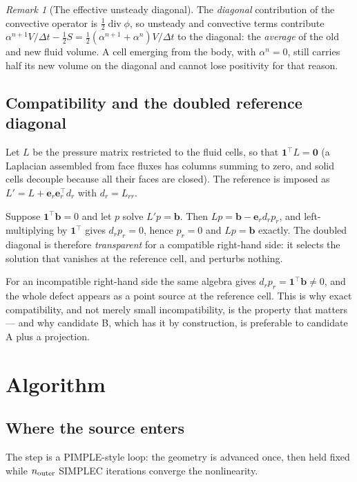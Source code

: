 \documentclass[11pt,a4paper]{article}
\theoremstyle{remark}
\newtheorem{remark}{Remark}
\newcommand{\dt}{\Delta t}
\begin{document}
\begin{remark}[The effective unsteady diagonal]
The \emph{diagonal} contribution of the convective operator is $\tfrac12\operatorname{div}\phi$,
so unsteady and convective terms contribute
$\alpha^{n+1}V/\dt-\tfrac12 S=\tfrac12(\alpha^{n+1}+\alpha^{n})V/\dt$ to the diagonal: the
\emph{average} of the old and new fluid volume. A cell emerging from the body, with
$\alpha^{n}=0$, still carries half its new volume on the diagonal and cannot lose positivity for
that reason.
\end{remark}

\subsection{Compatibility and the doubled reference diagonal}
\label{sec:compat}

Let $L$ be the pressure matrix restricted to the fluid cells, so that $\bm{1}^{\!\top}L=\bm{0}$
(a Laplacian assembled from face fluxes has columns summing to zero, and solid cells decouple
because all their faces are closed). The reference is imposed as
$L'=L+\bm{e}_r\bm{e}_r^{\!\top}d_r$ with $d_r=L_{rr}$.

Suppose $\bm{1}^{\!\top}\bm{b}=0$ and let $p$ solve $L'p=\bm{b}$. Then
$Lp=\bm{b}-\bm{e}_rd_rp_r$, and left-multiplying by $\bm{1}^{\!\top}$ gives $d_rp_r=0$, hence
$p_r=0$ and $Lp=\bm{b}$ exactly. The doubled diagonal is therefore \emph{transparent} for a
compatible right-hand side: it selects the solution that vanishes at the reference cell, and
perturbs nothing.

For an incompatible right-hand side the same algebra gives $d_rp_r=\bm{1}^{\!\top}\bm{b}\ne0$,
and the whole defect appears as a point source at the reference cell. This is why exact
compatibility, and not merely small incompatibility, is the property that matters --- and why
candidate B, which has it by construction, is preferable to candidate A plus a projection.

\section{Algorithm}

\subsection{Where the source enters}

The step is a PIMPLE-style loop: the geometry is advanced once, then held fixed while
$n_{\rm outer}$ SIMPLEC iterations converge the nonlinearity.
\end{document}
